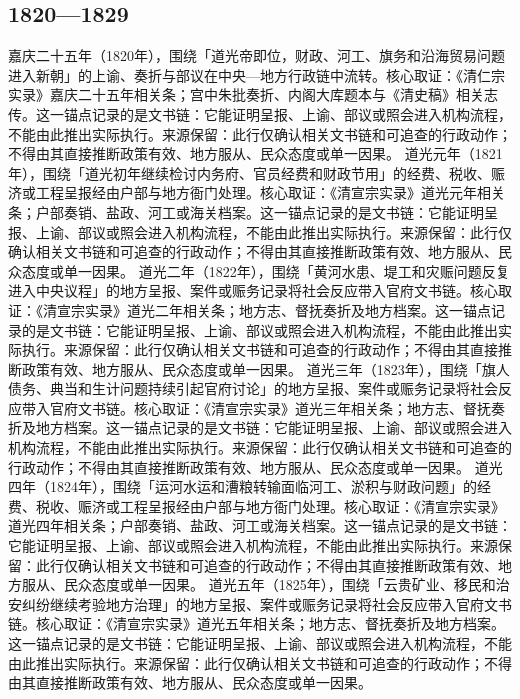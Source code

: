 \subsection{1820—1829}
嘉庆二十五年（1820年），围绕「道光帝即位，财政、河工、旗务和沿海贸易问题进入新朝」的上谕、奏折与部议在中央—地方行政链中流转。核心取证：《清仁宗实录》嘉庆二十五年相关条；宫中朱批奏折、内阁大库题本与《清史稿》相关志传。这一锚点记录的是文书链：它能证明呈报、上谕、部议或照会进入机构流程，不能由此推出实际执行。来源保留：此行仅确认相关文书链和可追查的行政动作；不得由其直接推断政策有效、地方服从、民众态度或单一因果。
道光元年（1821年），围绕「道光初年继续检讨内务府、官员经费和财政节用」的经费、税收、赈济或工程呈报经由户部与地方衙门处理。核心取证：《清宣宗实录》道光元年相关条；户部奏销、盐政、河工或海关档案。这一锚点记录的是文书链：它能证明呈报、上谕、部议或照会进入机构流程，不能由此推出实际执行。来源保留：此行仅确认相关文书链和可追查的行政动作；不得由其直接推断政策有效、地方服从、民众态度或单一因果。
道光二年（1822年），围绕「黄河水患、堤工和灾赈问题反复进入中央议程」的地方呈报、案件或赈务记录将社会反应带入官府文书链。核心取证：《清宣宗实录》道光二年相关条；地方志、督抚奏折及地方档案。这一锚点记录的是文书链：它能证明呈报、上谕、部议或照会进入机构流程，不能由此推出实际执行。来源保留：此行仅确认相关文书链和可追查的行政动作；不得由其直接推断政策有效、地方服从、民众态度或单一因果。
道光三年（1823年），围绕「旗人债务、典当和生计问题持续引起官府讨论」的地方呈报、案件或赈务记录将社会反应带入官府文书链。核心取证：《清宣宗实录》道光三年相关条；地方志、督抚奏折及地方档案。这一锚点记录的是文书链：它能证明呈报、上谕、部议或照会进入机构流程，不能由此推出实际执行。来源保留：此行仅确认相关文书链和可追查的行政动作；不得由其直接推断政策有效、地方服从、民众态度或单一因果。
道光四年（1824年），围绕「运河水运和漕粮转输面临河工、淤积与财政问题」的经费、税收、赈济或工程呈报经由户部与地方衙门处理。核心取证：《清宣宗实录》道光四年相关条；户部奏销、盐政、河工或海关档案。这一锚点记录的是文书链：它能证明呈报、上谕、部议或照会进入机构流程，不能由此推出实际执行。来源保留：此行仅确认相关文书链和可追查的行政动作；不得由其直接推断政策有效、地方服从、民众态度或单一因果。
道光五年（1825年），围绕「云贵矿业、移民和治安纠纷继续考验地方治理」的地方呈报、案件或赈务记录将社会反应带入官府文书链。核心取证：《清宣宗实录》道光五年相关条；地方志、督抚奏折及地方档案。这一锚点记录的是文书链：它能证明呈报、上谕、部议或照会进入机构流程，不能由此推出实际执行。来源保留：此行仅确认相关文书链和可追查的行政动作；不得由其直接推断政策有效、地方服从、民众态度或单一因果。
